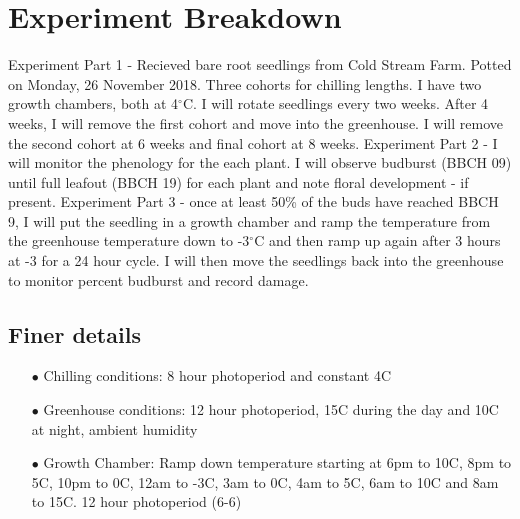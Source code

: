 \documentclass{article}\usepackage[]{graphicx}\usepackage[]{color}
\begin{document}
\renewcommand{\thetable}{\arabic{table}}
\renewcommand{\thefigure}{\arabic{figure}}
\renewcommand{\labelitemi}{$-$}

\renewcommand{\thesection}{\arabic{section}.}
\renewcommand\thesubsection{\arabic{section}.\arabic{subsection}} 

\section*{Experiment Breakdown}

Experiment Part 1 - Recieved bare root seedlings from Cold Stream Farm. Potted on Monday, 26 November 2018. Three cohorts for chilling lengths. I have two growth chambers, both at 4$^{\circ}$C. I will rotate seedlings every two weeks. After 4 weeks, I will remove the first cohort and move into the greenhouse. I will remove the second cohort at 6 weeks and final cohort at 8 weeks. Experiment Part 2 - I will monitor the phenology for the each plant. I will observe budburst (BBCH 09) until full leafout (BBCH 19) for each plant and note floral development - if present. Experiment Part 3 - once at least 50\% of the buds have reached BBCH 9, I will put the seedling in a growth chamber and ramp the temperature from the greenhouse temperature down to  -3$^{\circ}$C and then ramp up again after 3 hours at -3 for a 24 hour cycle. I will then move the seedlings back into the greenhouse to monitor percent budburst and record damage.

\subsection*{Finer details}
\begin{itemize}
\item[$\bullet$] Chilling conditions: 8 hour photoperiod and constant 4C
\item[$\bullet$] Greenhouse conditions: 12 hour photoperiod, 15C during the day and 10C at night, ambient humidity
\item[$\bullet$] Growth Chamber: Ramp down temperature starting at 6pm to 10C, 8pm to 5C, 10pm to 0C, 12am to -3C, 3am to 0C, 4am to 5C, 6am to 10C and 8am to 15C. 12 hour photoperiod (6-6) 
\end{itemize}
\end{document}
